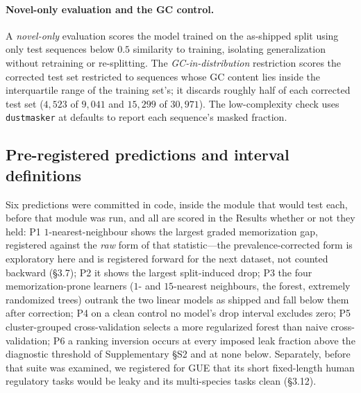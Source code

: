 \documentclass[11pt,a4paper]{article}
\begin{document}
\paragraph{Novel-only evaluation and the GC control.} A \emph{novel-only} evaluation scores the
model trained on the as-shipped split using only test sequences below $0.5$ similarity to training,
isolating generalization without retraining or re-splitting. The \emph{GC-in-distribution}
restriction scores the corrected test set restricted to sequences whose GC content lies inside the
interquartile range of the training set's; it discards roughly half of each corrected test set
($4{,}523$ of $9{,}041$ and $15{,}299$ of $30{,}971$). The low-complexity check uses
\texttt{dustmasker} \citep{morgulis2006dust} at defaults to report each sequence's masked fraction.


\subsection{Pre-registered predictions and interval definitions}\label{sec:s-prereg}
Six predictions were committed in code, inside the module that would test each, before that module was run, and all are scored in the Results whether or not they held: P1 $1$-nearest-neighbour shows the largest graded memorization gap, registered against the \emph{raw} form of that statistic---the prevalence-corrected form is exploratory here and is registered forward for the next dataset, not counted backward (\S3.7); P2 it shows the largest split-induced drop; P3 the four memorization-prone learners ($1$- and $15$-nearest neighbours, the forest, extremely randomized trees) outrank the two linear models as shipped and fall below them after correction; P4 on a clean control no model's drop interval excludes zero; P5 cluster-grouped cross-validation selects a more regularized forest than naive cross-validation; P6 a ranking inversion occurs at every imposed leak fraction above the diagnostic threshold of Supplementary \S S2 and at none below. Separately, before that suite was examined, we registered for GUE \citep{zhou2023dnabert2} that its short fixed-length human regulatory tasks would be leaky and its multi-species tasks clean (\S3.12).
\end{document}
